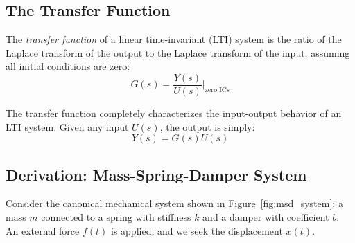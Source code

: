 \subsection{The Transfer Function}
\label{sec:transfer_function_def}

\begin{definition}
The \textit{transfer function} of a linear time-invariant (LTI) system is the ratio of the Laplace transform of the output to the Laplace transform of the input, assuming all initial conditions are zero:
\begin{equation}
G(s) = \frac{Y(s)}{U(s)}\bigg|_{\text{zero ICs}}
\label{eq:tf_def}
\end{equation}
\end{definition}

The transfer function completely characterizes the input-output behavior of an LTI system. Given any input $U(s)$, the output is simply:
\begin{equation}
Y(s) = G(s)U(s)
\end{equation}

\subsection{Derivation: Mass-Spring-Damper System}
\label{sec:msd_derivation}

Consider the canonical mechanical system shown in Figure~\ref{fig:msd_system}: a mass $m$ connected to a spring with stiffness $k$ and a damper with coefficient $b$. An external force $f(t)$ is applied, and we seek the displacement $x(t)$.

